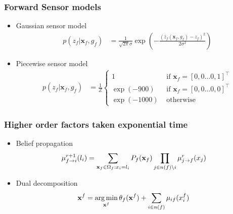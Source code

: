 \documentclass{beamer}
\DeclareMathOperator*{\argmin}{arg\,min}
\newcommand{\vect}[1]{\mathbf{#1}}
\newcommand{\map}{\vect{x}}
\begin{document}
\newcommand{\actz}{\bar{z}_f(\map_f, g_f)}
\begin{frame}
  \frametitle{Forward Sensor models}
  \begin{itemize}
      \item Gaussian sensor model
        \begin{align}
          p(z_f|\map_f, g_f) &=
          \frac{1}{\sqrt{2\pi}\sigma}\exp\left(-\frac{(\actz - z_f)^2}{2\sigma^2}\right)
          \label{eq:gaussiansensormodel}
        \end{align}
      \item Piecewise sensor model
        \begin{align}
          p(z_f|\map_f, g_f) &= \frac{1}{Z}\begin{cases}
                           1 & \text{ if } \map_f = [0, 0 \dots 0,
1]^\top\\
                  \exp(-900) & \text{ if } \map_f = [0, 0 \dots 0,
0]^\top\\
                 \exp(-1000) & \text{ otherwise}
        \end{cases}
        \label{eq:piecewiseconstant}
      \end{align}
  \end{itemize}
\end{frame}

\begin{frame}
  \frametitle{Higher order factors taken exponential time}
  \begin{itemize}
    \item Belief propagation
      \begin{align}
        \bpmsg{f}{i}{l_i}{r+1} &= \sum_{\map_f \in \Omega_f: x_i = l_i}P_f(\map_f)\prod_{j \in n(f) \setminus i}\bpmsg{j}{f}{x_j}{r}
      \end{align}
    \item Dual decomposition
      \begin{align}
        \map^f &= \argmin\limits_{\map^f} \theta_f(\map^f)
        +\sum\limits_{i \in n(f)}\msg{i}{f}{x^f_i}
      \end{align}
  \end{itemize}
\end{frame}
\end{document}
